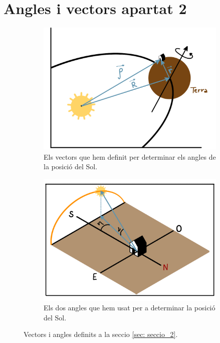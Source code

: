\documentclass[11pt]{article}
\begin{document}
\section{Angles i vectors apartat 2}
\begin{figure}[hbt]
    \centering
    \begin{subfigure}{0.5\textwidth}
        \centering
        \includegraphics[width=\textwidth]{vectors.PNG}
        \caption{Els vectors que hem definit per determinar els angles de la posició del Sol.}
        \label{fig: sist_vectors}
    \end{subfigure}%
    \hspace{0.000001\textwidth}%
    \begin{subfigure}{0.5\textwidth}
        \centering
        \includegraphics[width=\textwidth]{ang_sol.PNG}
        \caption{Els dos angles que hem usat per a determinar la posició del Sol.}
        \label{fig: sist_sol}
    \end{subfigure}
\label{fig: sistemes1}
\caption{Vectors i angles definits a la seccio \ref{sec: seccio_2}.}
\end{figure}
\end{document}
